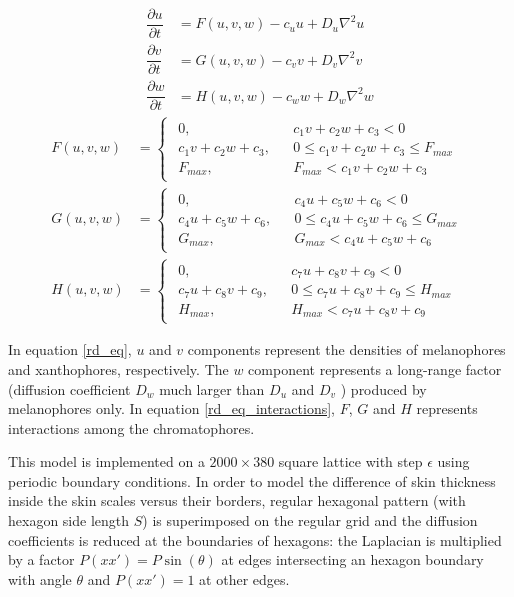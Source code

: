 \documentclass[a4paper]{article}
\begin{document}
\begin{align}
	\dfrac{\partial u}{\partial t} & = F ( u , v , w ) - c_u u + D_u \nabla^2 u \\
	\dfrac{\partial v}{\partial t} & = G ( u , v , w ) - c_v v + D_v \nabla^2 v \\
	\dfrac{\partial w}{\partial t} & = H ( u , v , w ) - c_w w + D_w \nabla^2 w
	\label{rd_eq}
\end{align}
\begin{align}
	F ( u , v , w ) & = \begin{cases} \begin{aligned}
		0, && c_1 v + c_2 w + c_3 < 0 \\
		c_1 v + c_2 w + c_3, && 0 \leq c_1 v + c_2 w + c_3 \leq F_{max} \\
		F_{max}, && F_{max} < c_1 v + c_2 w + c_3
	\end{aligned} \end{cases} \\
	G ( u , v , w ) & = \begin{cases} \begin{aligned}
		0, && c_4 u + c_5 w + c_6 < 0 \\
		c_4 u + c_5 w + c_6, && 0 \leq c_4 u + c_5 w + c_6 \leq G_{max} \\
		G_{max}, && G_{max} < c_4 u + c_5 w + c_6
	\end{aligned} \end{cases} \\
	H ( u , v , w ) & = \begin{cases} \begin{aligned}
		0, && c_7 u + c_8 v + c_9 < 0 \\
		c_7 u + c_8 v + c_9, && 0 \leq c_7 u + c_8 v + c_9 \leq H_{max} \\
		H_{max}, && H_{max} < c_7 u + c_8 v + c_9
	\end{aligned} \end{cases}
	\label{rd_eq_interactions}
\end{align}

In equation \ref{rd_eq}, $u$ and $v$ components represent the densities of melanophores and xanthophores, respectively. The $w$ component represents a long-range factor (diffusion coefficient $D_w$ much larger than $D_u$ and $D_v$ ) produced by melanophores only.
In equation \ref{rd_eq_interactions}, $F$, $G$ and $H$ represents interactions among the chromatophores.

This model is implemented on a $2000 \times 380$ square lattice with step $\epsilon$ using periodic boundary conditions. In order to model the difference of skin thickness inside the skin scales versus their borders, regular hexagonal pattern (with hexagon side length $S$) is superimposed on the regular grid and the diffusion coefficients is reduced at the boundaries of hexagons: the Laplacian is multiplied by a factor $P(xx') = P \sin (\theta)$ at edges intersecting an hexagon boundary with angle $\theta$ and $P(xx') = 1$ at other edges.
\end{document}
